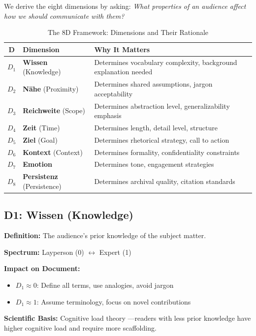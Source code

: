 We derive the eight dimensions by asking: \textit{What properties of an audience
affect how we should communicate with them?}

\begin{table}[htbp]
\centering
\caption{The 8D Framework: Dimensions and Their Rationale}
\label{tab:8d-rationale}
\renewcommand{\arraystretch}{1.5}
\begin{tabular}{@{}clp{7cm}@{}}
\toprule
\textbf{D} & \textbf{Dimension} & \textbf{Why It Matters} \\
\midrule
$D_1$ & \textbf{Wissen} (Knowledge) &
Determines vocabulary complexity, background explanation needed \\
$D_2$ & \textbf{N\"ahe} (Proximity) &
Determines shared assumptions, jargon acceptability \\
$D_3$ & \textbf{Reichweite} (Scope) &
Determines abstraction level, generalizability emphasis \\
$D_4$ & \textbf{Zeit} (Time) &
Determines length, detail level, structure \\
$D_5$ & \textbf{Ziel} (Goal) &
Determines rhetorical strategy, call to action \\
$D_6$ & \textbf{Kontext} (Context) &
Determines formality, confidentiality constraints \\
$D_7$ & \textbf{Emotion} &
Determines tone, engagement strategies \\
$D_8$ & \textbf{Persistenz} (Persistence) &
Determines archival quality, citation standards \\
\bottomrule
\end{tabular}
\end{table}

\subsection{D1: Wissen (Knowledge)}

\textbf{Definition:} The audience's prior knowledge of the subject matter.

\textbf{Spectrum:} Layperson (0) $\leftrightarrow$ Expert (1)

\textbf{Impact on Document:}
\begin{itemize}[nosep]
\item $D_1 \approx 0$: Define all terms, use analogies, avoid jargon
\item $D_1 \approx 1$: Assume terminology, focus on novel contributions
\end{itemize}

\textbf{Scientific Basis:} Cognitive load theory \citep{sweller1988}---readers
with less prior knowledge have higher cognitive load and require more scaffolding.


